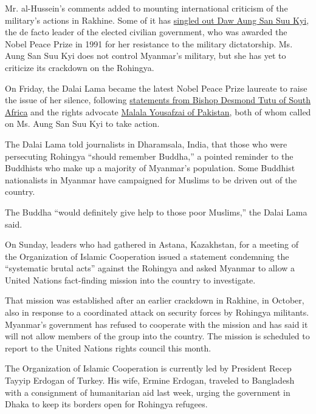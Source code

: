 Mr. al-Hussein's comments added to mounting international criticism of
the military's actions in Rakhine. Some of it has
\href{https://www.nytimes3xbfgragh.onion/interactive/2017/09/09/opinion/kristof-nobel-prize-aung-san-suu-kyi-shame.html}{singled
out Daw Aung San Suu Kyi}, the de facto leader of the elected civilian
government, who was awarded the Nobel Peace Prize in 1991 for her
resistance to the military dictatorship. Ms. Aung San Suu Kyi does not
control Myanmar's military, but she has yet to criticize its crackdown
on the Rohingya.

On Friday, the Dalai Lama became the latest Nobel Peace Prize laureate
to raise the issue of her silence, following
\href{https://www.facebookcorewwwi.onion/DesmondTutuOfficial/posts/1136360939841237?pnref=story}{statements
from Bishop Desmond Tutu of South Africa} and the rights advocate
\href{https://twitter.com/Malala/status/904449772844711938}{Malala
Yousafzai of Pakistan}, both of whom called on Ms. Aung San Suu Kyi to
take action.

The Dalai Lama told journalists in Dharamsala, India, that those who
were persecuting Rohingya ``should remember Buddha,'' a pointed reminder
to the Buddhists who make up a majority of Myanmar's population. Some
Buddhist nationalists in Myanmar have campaigned for Muslims to be
driven out of the country.

The Buddha ``would definitely give help to those poor Muslims,'' the
Dalai Lama said.

On Sunday, leaders who had gathered in Astana, Kazakhstan, for a meeting
of the Organization of Islamic Cooperation issued a statement condemning
the ``systematic brutal acts'' against the Rohingya and asked Myanmar to
allow a United Nations fact-finding mission into the country to
investigate.

That mission was established after an earlier crackdown in Rakhine, in
October, also in response to a coordinated attack on security forces by
Rohingya militants. Myanmar's government has refused to cooperate with
the mission and has said it will not allow members of the group into the
country. The mission is scheduled to report to the United Nations rights
council this month.

The Organization of Islamic Cooperation is currently led by President
Recep Tayyip Erdogan of Turkey. His wife, Ermine Erdogan, traveled to
Bangladesh with a consignment of humanitarian aid last week, urging the
government in Dhaka to keep its borders open for Rohingya refugees.

